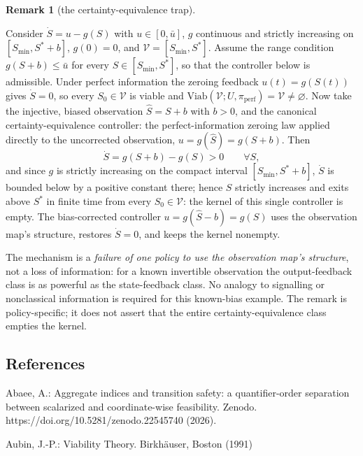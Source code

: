 \documentclass[11pt]{article}
\theoremstyle{definition}
\newtheorem{remark}{Remark}
\begin{document}
\begin{remark}[the certainty-equivalence trap]\label{rem:ce-trap}

Consider \(\dot S = u - g(S)\) with \(u \in [0, \bar u]\), \(g\) continuous and strictly
increasing on \([S_{\min}, S^* + b]\), \(g(0) = 0\), and
\(\mathcal{V} = [S_{\min}, S^*]\). Assume the range condition
\(g(S + b) \le \bar u\) for every \(S \in [S_{\min}, S^*]\), so that the
controller below is admissible. Under perfect information the zeroing
feedback \(u(t) = g(S(t))\) gives \(\dot S = 0\), so every
\(S_0 \in \mathcal{V}\) is viable and
\(\mathrm{Viab}(\mathcal{V}; U, \pi_{\mathrm{perf}}) = \mathcal{V} \neq \varnothing\).
Now take the injective, biased observation \(\hat S = S + b\) with
\(b > 0\), and the canonical certainty-equivalence controller: the
perfect-information zeroing law applied directly to the uncorrected
observation, \(u = g(\hat S) = g(S + b)\). Then
\[\dot S = g(S + b) - g(S) > 0 \qquad \forall S,\]
and since \(g\) is strictly increasing on the compact interval
\([S_{\min}, S^* + b]\), \(\dot S\) is bounded below by a positive
constant there; hence \(S\) strictly increases and exits above \(S^*\) in
finite time from every \(S_0 \in \mathcal{V}\): the kernel of this single
controller is empty. The bias-corrected controller
\(u = g(\hat S - b) = g(S)\) uses the observation map's structure, restores
\(\dot S = 0\), and keeps the kernel nonempty.

The mechanism is a \emph{failure of one policy to use the observation
map's structure}, not a loss of information: for a known invertible
observation the output-feedback class is as powerful as the
state-feedback class. No analogy to signalling or nonclassical information is required for this known-bias example. The remark is
policy-specific; it does not assert that the entire certainty-equivalence
class empties the kernel.

\end{remark}

\subsection{References}\label{references}

Abaee, A.: Aggregate indices and transition safety: a quantifier-order separation between scalarized and coordinate-wise feasibility. Zenodo. https://doi.org/10.5281/zenodo.22545740 (2026).

Aubin, J.-P.: Viability Theory. Birkh\"auser, Boston (1991)
\end{document}
